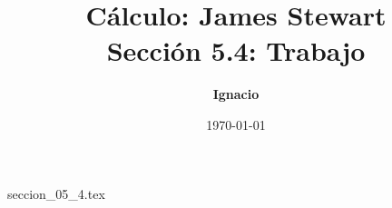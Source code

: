 \documentclass[11pt,spanish,oneside]{report}
\title{\textbf{Cálculo: James Stewart} \\ \Large Sección 5.4: Trabajo}
\author{\textbf{Ignacio}}
\date{\today}
\begin{document}
\maketitle

{seccion_05_4.tex}
\end{document}
